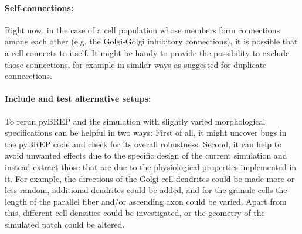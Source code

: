 \documentclass[12pt]{report}
\begin{document}
\paragraph*{Self-connections:} Right now, in the case of a cell population whose members form connections among each other (e.g. the Golgi-Golgi inhibitory connections), it is possible that a cell connects to itself. It might be handy to provide the possibility to exclude those connections, for example in similar ways as suggested for duplicate connecctions.


\paragraph*{Include and test alternative setups:} To rerun pyBREP and the simulation with slightly varied morphological specifications can be helpful in two ways: First of all, it might uncover bugs in the pyBREP code and check for its overall robustness. Second, it can help to avoid unwanted effects due to the specific design of the current simulation and instead extract those that are due to the physiological properties implemented in it. For example, the directions of the Golgi cell dendrites could be made more or less random, additional dendrites could be added, and for the granule cells the length of the parallel fiber and/or ascending axon could be varied. Apart from this, different cell densities could be investigated, or the geometry of the simulated patch could be altered.
\end{document}
